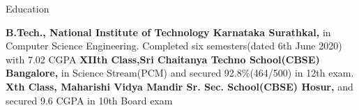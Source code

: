 \begin{rubric}{Education}

\entry*[2017 -- tillDate]%
	\textbf{B.Tech., National Institute of Technology Karnataka Surathkal,} in Computer Science Engineering. Completed six semesters(dated 6th June 2020) with 7.02 CGPA
%
\entry*[2015 -- 2017]%
	\textbf{XIIth Class,Sri Chaitanya Techno School(CBSE) Bangalore,} in  Science Stream(PCM) and secured 92.8\%(464/500) in 12th exam.
%
\entry*[2003-2015]%
	\textbf{Xth Class, Maharishi Vidya Mandir Sr. Sec. School(CBSE) Hosur,} and secured 9.6 CGPA in 10th Board exam
\end{rubric}